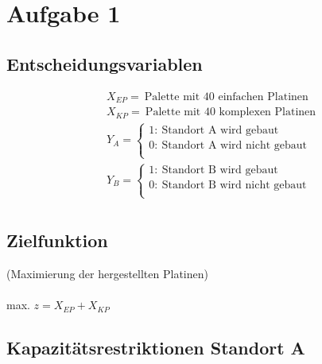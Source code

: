 \documentclass[a4paper,11pt]{article}
\begin{document}
\raggedright %

\section*{Aufgabe 1}

\subsection*{Entscheidungsvariablen}

\begin{align*}
& X_{EP} = ~\text{Palette mit 40 einfachen Platinen} \\
& X_{KP} = ~\text{Palette mit 40 komplexen Platinen} \\
& Y_A = \left\{\begin{array}{l}
            1: ~\text{Standort A wird gebaut} \\
            0: ~\text{Standort A wird nicht gebaut} \\
          \end{array}\right. \\
%
&Y_B = \left\{\begin{array}{l}
            1: ~\text{Standort B wird gebaut} \\
            0: ~\text{Standort B wird nicht gebaut} \\
          \end{array}\right. \\
\end{align*}

\subsection*{Zielfunktion}
(Maximierung der hergestellten Platinen) \\~\\

max. $z  = X_{EP} + X_{KP}$ \\

\subsection*{Kapazitätsrestriktionen Standort A}
\end{document}
